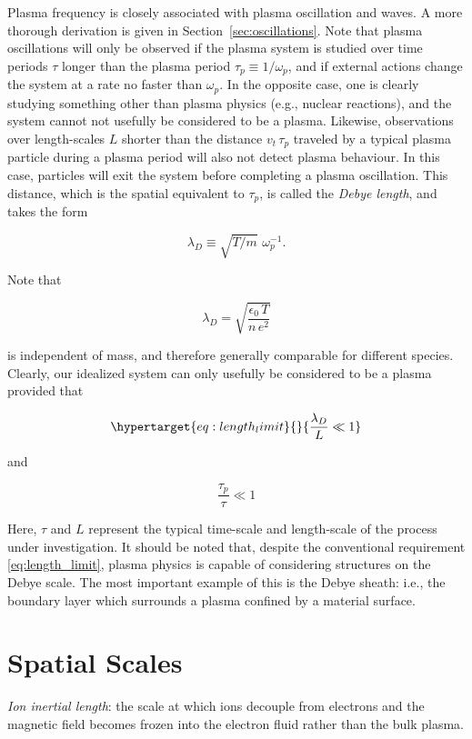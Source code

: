 \documentclass[
  notoc %
]{tufte-book}
\begin{document}
Plasma frequency is closely associated with plasma oscillation and
waves. A more thorough derivation is given in
Section~\ref{sec:oscillations}. Note that plasma oscillations will only
be observed if the plasma system is studied over time periods \(\tau\)
longer than the plasma period \(\tau_p\equiv 1/\omega_p\), and if
external actions change the system at a rate no faster than
\(\omega_p\). In the opposite case, one is clearly studying something
other than plasma physics (e.g., nuclear reactions), and the system
cannot not usefully be considered to be a plasma. Likewise, observations
over length-scales \(L\) shorter than the distance \(v_t\,\tau_p\)
traveled by a typical plasma particle during a plasma period will also
not detect plasma behaviour. In this case, particles will exit the
system before completing a plasma oscillation. This distance, which is
the spatial equivalent to \(\tau_p\), is called the \emph{Debye length},
and takes the form

\[
\lambda_D \equiv \sqrt{T/m}\,\,\omega_p^{-1}.
\]

Note that

\[
\lambda_D = \sqrt{\frac{\epsilon_0\,T}{n\,e^2}}
\]

is independent of mass, and therefore generally comparable for different
species. Clearly, our idealized system can only usefully be considered
to be a plasma provided that

\begin{equation}\protect\hypertarget{eq:length_limit}{}{
\frac{\lambda_D}{L} \ll 1
}\label{eq:length_limit}\end{equation}

and

\[
\frac{\tau_p}{\tau}\ll 1
\]

Here, \(\tau\) and \(L\) represent the typical time-scale and
length-scale of the process under investigation. It should be noted
that, despite the conventional requirement \ref{eq:length_limit}, plasma
physics is capable of considering structures on the Debye scale. The
most important example of this is the Debye sheath: i.e., the boundary
layer which surrounds a plasma confined by a material surface.

\hypertarget{spatial-scales}{%
\section{Spatial Scales}\label{spatial-scales}}

\emph{Ion inertial length}: the scale at which ions decouple from
electrons and the magnetic field becomes frozen into the electron fluid
rather than the bulk plasma.
\end{document}
